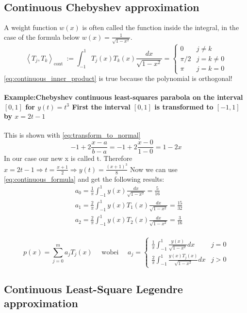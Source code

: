 \subsection{Continuous Chebyshev approximation}
A weight function $w(x)$ is often called the function inside the integral, in the case of the formula below $w(x)=\frac{1}{\sqrt{1-x^2}}$.
\begin{equation}\label{eq:continuous_inner_product}
\left\langle T_j, T_k\right\rangle_{\text {cont }}:=\int_{-1}^1 T_j(x) T_k(x) \frac{d x}{\sqrt{1-x^2}}=\left\{\begin{array}{cc}
0 & j \neq k \\
\pi / 2 & j=k \neq 0 \\
\pi & j=k=0
\end{array}\right.
\end{equation}
\autoref{eq:continuous_inner_product} is true because the polynomial is orthogonal!
\paragraph{Example:Chebyshev continuous least-squares parabola on the interval $[0,1]$ for $y(t)=t^3$
First the interval $[0,1]$ is transformed to $[-1,1]$ by $x=2t-1$}
This is shown with \autoref{eq:transform_to_normal}
$$
-1+2 \frac{x-a}{b-a}=-1+2 \frac{x-0}{1-0}=1-2x
$$
In our case our new x is called t. Therefore $x=2t-1 \Rightarrow t=\frac{x+1}{2} \Rightarrow y(t)=\frac{(x+1)^3}{8}$
Now we can use \autoref{eq:continuous_formula} and get the following results:
$$
\begin{aligned}
&a_0=\frac{1}{\pi} \int_{-1}^1 y(x) \frac{d x}{\sqrt{1-x^2}}=\frac{5}{16}\\
&a_1=\frac{2}{\pi} \int_{-1}^1 y(x) T_1(x) \frac{d x}{\sqrt{1-x^2}}=\frac{15}{32}\\
&a_2=\frac{2}{\pi} \int_{-1}^1 y(x) T_2(x) \frac{d x}{\sqrt{1-x^2}}=\frac{3}{16}\\
\end{aligned}
$$

\begin{equation}\label{eq:continuous_formula}
p(x)=\sum_{j=0}^{m} a_{j} T_{j}(x) \quad \text { wobei } \quad a_{j}= \begin{cases}\frac{1}{\pi} \int_{-1}^{1} \frac{y(x)}{\sqrt{1-x^{2}}} d x & j=0 \\ \frac{2}{\pi} \int_{-1}^{1} \frac{y(x) T_{j}(x)}{\sqrt{1-x^{2}}} d x & j>0\end{cases}
\end{equation}
\subsection{Continuous Least-Square Legendre approximation}
